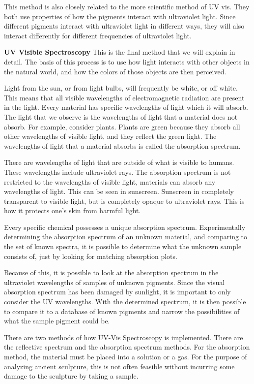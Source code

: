 \documentclass[10pt]{armath}
\begin{document}
This method is also closely related to the more scientific method of UV vis.
They both use properties of how the pigments interact with ultraviolet light.
Since different pigments interact with ultraviolet light in different ways,
they will also interact differently for different frequencies of ultraviolet
light.

\textbf{UV Visible Spectroscopy} This is the final method that we will explain
in detail. The basis of this process is to use how light interacts with other
objects in the natural world, and how the colors of those objects are then
perceived.

Light from the sun, or from light bulbs, will frequently be white, or off
white. This means that all visible wavelengths of electromagnetic radiation are
present in the light. Every material has specific wavelengths of light which it
will absorb. The light that we observe is the wavelengths of light that a
material does not absorb. For example, consider plants. Plants are green
because they absorb all other wavelengths of visible light, and they reflect
the green light. The wavelengths of light that a material absorbs is called the
absorption spectrum.

There are wavelengths of light that are outside of what is visible to humans.
These wavelengths include ultraviolet rays. The absorption spectrum is not
restricted to the wavelengths of visible light, materials can absorb any
wavelengths of light. This can be seen in sunscreen. Sunscreen in completely
transparent to visible light, but is completely opaque to ultraviolet rays.
This is how it protects one's skin from harmful light.

Every specific chemical possesses a unique absorption spectrum. Experimentally
determining the absorption spectrum of an unknown material, and comparing to
the set of known spectra, it is possible to determine what the unknown sample
consists of, just by looking for matching absorption plots.

Because of this, it is possible to look at the absorption spectrum in the
ultraviolet wavelengths of samples of unknown pigments. Since the visual
absorption spectrum has been damaged by sunlight, it is important to only
consider the UV wavelengths. With the determined spectrum, it is then possible
to compare it to a database of known pigments and narrow the possibilities of
what the sample pigment could be.

There are two methods of how UV-Vis Spectroscopy is implemented. There are the
reflective spectrum and the absorption spectrum methods. For the absorption
method, the material must be placed into a solution or a gas. For the purpose
of analyzing ancient sculpture, this is not often feasible without incurring
some damage to the sculpture by taking a sample.
\end{document}
